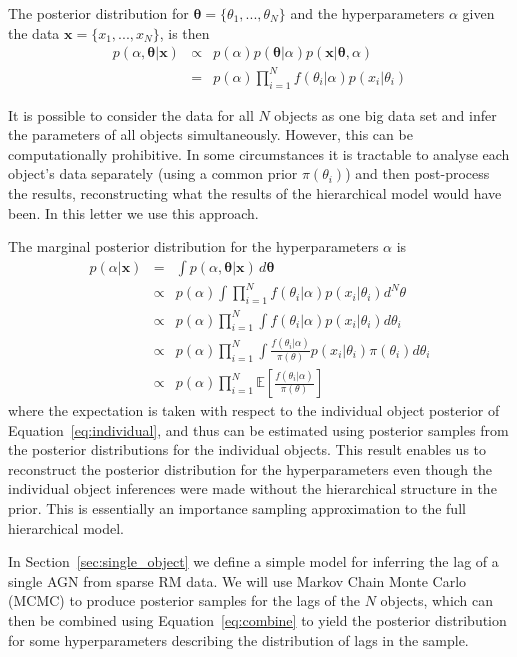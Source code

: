 \documentclass[useAMS,usenatbib]{mn2e}
\renewcommand{\btheta}{\boldsymbol{\theta}}
\newcommand{\bx}{\boldsymbol{x}}
\begin{document}
The posterior distribution for
$\btheta = \{\theta_1, ..., \theta_N\}$ and the hyperparameters $\alpha$
given the data 
$\bx = \{x_1, ..., x_N\}$, is then
\begin{eqnarray}
p(\alpha, \btheta | \bx) &\propto&
p(\alpha)p(\btheta|\alpha)p(\bx | \btheta, \alpha)\\
&=& p(\alpha)\prod_{i=1}^N f(\theta_i|\alpha)p(x_i | \theta_i)
\end{eqnarray}

It is possible to consider the data for all $N$ objects as one big data set
and infer the parameters of all objects simultaneously. However, this can be
computationally prohibitive. In some circumstances it is tractable to analyse
each object's data separately (using a common prior $\pi(\theta_i)$) and
then post-process the results, reconstructing what the results of the
hierarchical model would have been. In this letter we use this approach.

The marginal posterior distribution for the hyperparameters $\alpha$ is
\begin{eqnarray}
p(\alpha | \bx) &=&
\int p(\alpha, \btheta|\bx) \, d\btheta\\
&\propto& p(\alpha)\int \prod_{i=1}^N f(\theta_i|\alpha)p(x_i | \theta_i) d^N\theta\\
&\propto& p(\alpha) \prod_{i=1}^N \int f(\theta_i|\alpha)p(x_i | \theta_i) d\theta_i\\
&\propto& p(\alpha) \prod_{i=1}^N \int \frac{f(\theta_i|\alpha)}{\pi(\theta)}p(x_i | \theta_i) \pi(\theta_i)d\theta_i\\
&\propto& p(\alpha) \prod_{i=1}^N \mathds{E}\left[\frac{f(\theta_i|\alpha)}{\pi(\theta)}\right]\label{eq:combine}
\end{eqnarray}
where the expectation is taken with respect to the individual object posterior
of Equation~\ref{eq:individual}, and thus can be estimated using posterior
samples from the posterior distributions for the individual objects.
This result enables us to reconstruct the
posterior distribution for the hyperparameters even though the individual object
inferences were made without the hierarchical structure in the prior. This is
essentially an importance sampling approximation to the
full hierarchical model.

In Section~\ref{sec:single_object} we define a simple model for inferring the
lag of a single AGN from sparse RM data. We will use Markov Chain Monte Carlo
(MCMC) to produce posterior samples for the lags of the $N$ objects, which can
then be combined using Equation~\ref{eq:combine} to yield the posterior
distribution for some hyperparameters describing the distribution of
lags in the sample.
\end{document}
